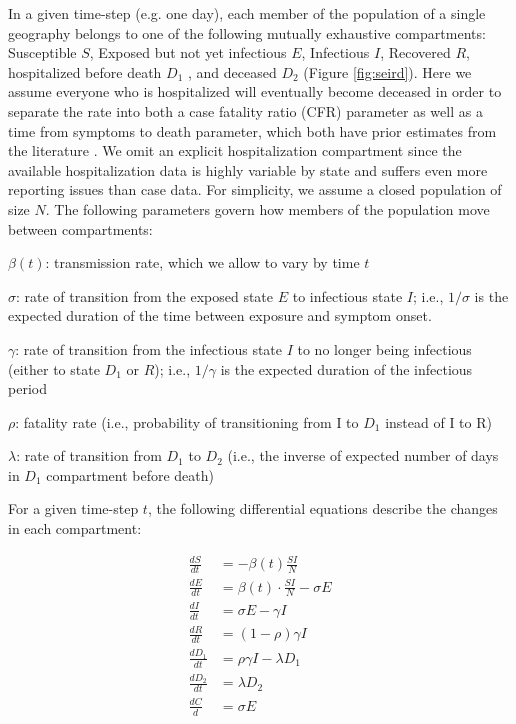 \documentclass[11pt]{amsart}
\newenvironment{packed_item}{
\begin{itemize}
 \setlength{\itemsep}{0pt}
  \setlength{\parskip}{0pt}
  \setlength{\parsep}{0pt}
}{\end{itemize}}
\begin{document}
In a given time-step (e.g. one day), each member of the population of a single geography belongs to one of the following mutually exhaustive compartments:
 Susceptible $S$, Exposed but not yet infectious $E$, Infectious $I$, Recovered $R$, hospitalized before death $D_1$ , and  deceased $D_2$ (Figure \ref{fig:seird}). Here we assume everyone who is hospitalized will eventually become deceased in order to separate the rate into both a case fatality ratio (CFR) parameter as well as a time from symptoms to death parameter, which both have prior estimates from the literature \cite{russell2020estimating}. We omit an explicit hospitalization compartment since the available hospitalization data is highly variable by state and suffers even more reporting issues than case data.  For simplicity, we assume a closed population of size $N$. 
The following parameters govern how members of the population move between compartments:  
\begin{packed_item}
\item $\beta(t)$: transmission rate, which we allow to vary by time $t$
\item $\sigma$: rate of transition from the exposed state $E$ to infectious state $I$; i.e., $1/\sigma$ is the expected duration of the time between exposure and symptom onset. 
\item $\gamma$: rate of transition from  the infectious state $I$ to no longer being infectious (either to state $D_1$ or $R$); i.e., $1/\gamma$ is the expected duration of the infectious period
\item $\rho$: fatality rate (i.e., probability of transitioning from I to $D_1$ instead of I to R)
\item $\lambda$: rate of transition from $D_1$ to $D_2$ 
(i.e., the inverse of expected number of days in $D_1$ compartment before death) 
\end{packed_item}
For a given time-step $t$, the following differential equations describe the changes in each compartment:

\begin{equation}
\begin{aligned} 
\frac{dS}{dt} &= - \beta(t) \frac{SI}{N} \\
\frac{dE}{dt} &= \beta(t) \cdot \frac{SI}{N} - \sigma E \\
\frac{dI}{dt} &= \sigma E - \gamma I\\ 
\frac{dR}{dt} &= (1-\rho)\gamma I \\
\frac{dD_1}{dt} &= \rho \gamma I - \lambda D_1\\
\frac{dD_2}{dt} &= \lambda D_2\\
\frac{dC}{d} &= \sigma E
\end{aligned}
\end{equation}
\end{document}

